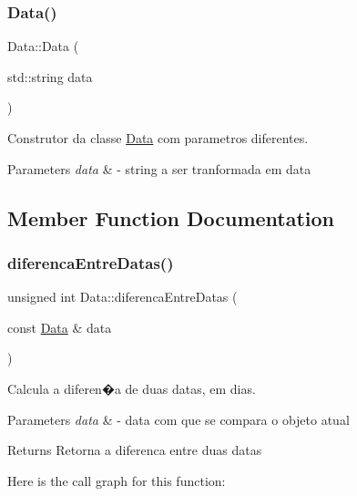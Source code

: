\subsubsection{\texorpdfstring{Data()}{Data()}\hspace{0.1cm}{\footnotesize\ttfamily [2/2]}}
{\footnotesize\ttfamily Data\+::\+Data (\begin{DoxyParamCaption}\item[{std\+::string}]{data }\end{DoxyParamCaption})}



Construtor da classe \mbox{\hyperlink{class_data}{Data}} com parametros diferentes. 


\begin{DoxyParams}{Parameters}
{\em data} & -\/ string a ser tranformada em data \\
\hline
\end{DoxyParams}


\subsection{Member Function Documentation}
\mbox{\label{class_data_a495d15dd0d90b595740f6e09fd0a2177}} 
\subsubsection{\texorpdfstring{diferenca\+Entre\+Datas()}{diferencaEntreDatas()}}
{\footnotesize\ttfamily unsigned int Data\+::diferenca\+Entre\+Datas (\begin{DoxyParamCaption}\item[{const \mbox{\hyperlink{class_data}{Data}} \&}]{data }\end{DoxyParamCaption})}



Calcula a diferen�a de duas datas, em dias. 


\begin{DoxyParams}{Parameters}
{\em data} & -\/ data com que se compara o objeto atual \\
\hline
\end{DoxyParams}
\begin{DoxyReturn}{Returns}
Retorna a diferenca entre duas datas 
\end{DoxyReturn}
Here is the call graph for this function\+:
\mbox{\label{class_data_ae19e0d5af87f94f2809ba52dae69e15b}} 
